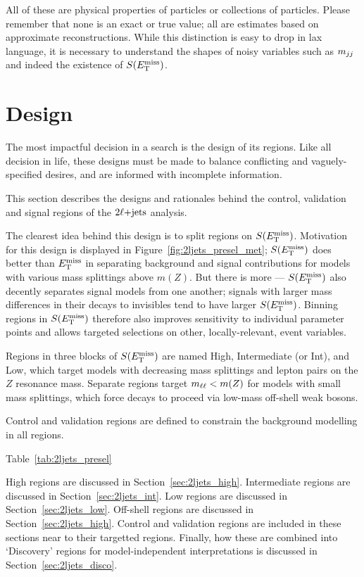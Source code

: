 All of these are physical properties of particles or collections of particles.
Please remember that none is an exact or true value;
all are estimates based on approximate reconstructions.
While this distinction is easy to drop in lax language, it is necessary to
understand the shapes of noisy variables such as $m_{jj}$ and indeed the
existence of $S(E_\mathrm{T}^\mathrm{miss})$.


\FloatBarrier
\section{Design}
The most impactful decision in a search is the design of its regions.
Like all decision in life, these designs must be made to balance conflicting
and vaguely-specified desires, and are informed with incomplete information.

This section describes the designs and rationales behind the control, validation
and signal regions of the $2\ell\mathrm{+jets}$ analysis.

The clearest idea behind this design is to split regions on $S(E_\mathrm{T}^\mathrm{miss})$.
Motivation for this design is displayed in
Figure~\ref{fig:2ljets_presel_met};
$S(E_\mathrm{T}^\mathrm{miss})$ does better than $E_\mathrm{T}^\mathrm{miss}$ in separating background and signal
contributions for models with various mass splittings above $m(Z)$.
But there is more --- $S(E_\mathrm{T}^\mathrm{miss})$ also decently separates signal models from one
another;
signals with larger mass differences in their decays to invisibles tend to have
larger $S(E_\mathrm{T}^\mathrm{miss})$.
Binning regions in $S(E_\mathrm{T}^\mathrm{miss})$ therefore also improves sensitivity to
individual parameter points and allows targeted selections on other,
locally-relevant, event variables.

Regions in three blocks of $S(E_\mathrm{T}^\mathrm{miss})$ are named High, Intermediate (or Int),
and Low,
which target models with decreasing mass splittings and lepton pairs on the
$Z$ resonance mass.
Separate regions target $m_{\ell\ell} < m(Z)$ for models with small mass splittings,
which force decays to proceed via low-mass off-shell weak bosons.

Control and validation regions are defined to constrain the background
modelling in all regions.

Table~\ref{tab:2ljets_presel}

High regions are discussed in Section~\ref{sec:2ljets_high}.
Intermediate regions are discussed in Section~\ref{sec:2ljets_int}.
Low regions are discussed in Section~\ref{sec:2ljets_low}.
Off-shell regions are discussed in Section~\ref{sec:2ljets_high}.
Control and validation regions are included in these sections near to their
targetted regions.
Finally, how these are combined into `Discovery' regions for
model-independent interpretations is discussed in
Section~\ref{sec:2ljets_disco}.


